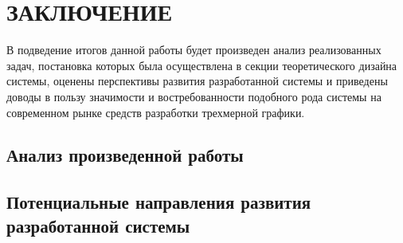 \section{ЗАКЛЮЧЕНИЕ}
\label{sec:outro}

В подведение итогов данной работы будет произведен анализ реализованных задач, постановка которых была осуществлена в секции теоретического дизайна системы, оценены перспективы развития
разработанной системы и приведены доводы в пользу значимости и востребованности подобного рода системы на современном рынке средств разработки трехмерной графики.

\subsection{Анализ произведенной работы}
\label{sub:outro:overview_outro}


\subsection{Потенциальные направления развития разработанной системы}
\label{sub:domain:future}

